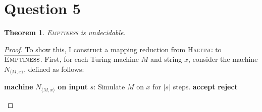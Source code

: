 \documentclass[a4paper,12pt]{scrartcl}
\newcommand{\Machine}[2]{\State \textbf{machine} #1 \textbf{on input} #2:}
\newcommand{\Reject}{\State \textbf{reject}}
\newcommand{\Accept}{\State \textbf{accept}}
\newcommand{\encode}[1]{\langle #1 \rangle}
\newtheorem{theorem}{Theorem}
\begin{document}
\section{Question 5}
\begin{theorem}
    \textsc{Emptiness} is undecidable.
\end{theorem}
\begin{proof}
    To show this, I construct a mapping reduction from \textsc{Halting} to $\overline{\textsc{Emptiness}}$. First, for each Turing-machine $M$ and string $x$, consider the machine $N_{\encode{M, x}}$, defined as follows:
    
\begin{algorithmic}[1]
    \Machine{$N_{\encode{M, x}}$}{$s$}
    \State Simulate $M$ on $x$ for $|s|$ steps.
        \Accept
    \EndIf
    \Reject
\end{algorithmic}


\end{proof}
\end{document}
